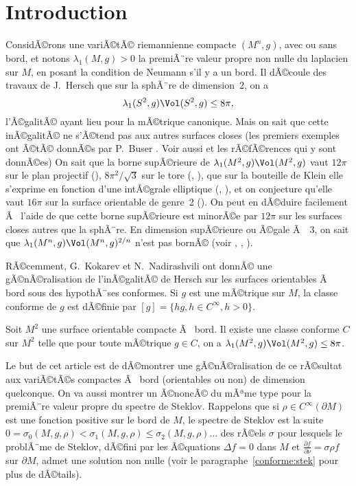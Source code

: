 \documentclass[11pt,a4paper]{smfart}
\begin{document}
\section{Introduction}
ConsidÃ©rons une variÃ©tÃ© riemannienne compacte $(M^n,g)$, avec ou sans bord,
et notons $\lambda_1(M,g)>0$ la premiÃ¨re valeur propre non nulle
du laplacien sur $M$, en posant la condition de Neumann s'il y a un bord.
Il dÃ©coule des travaux de J.~Hersch \cite{he70} que sur la sphÃ¨re de
dimension~2, on a
\begin{equation}
\lambda_1(S^2,g)\Vol(S^2,g)\leq8\pi,
\end{equation}
l'Ã©galitÃ© ayant lieu pour la mÃ©trique canonique.
Mais on sait que cette inÃ©galitÃ© ne s'Ã©tend pas aux autres surfaces closes
(les premiers exemples ont Ã©tÃ© donnÃ©s par P.~Buser \cite{bu84}. Voir
aussi \cite{bm01} et les rÃ©fÃ©rences qui y sont donnÃ©es)
On sait que la borne supÃ©rieure de $\lambda_1(M^2,g)\Vol(M^2,g)$ vaut
$12\pi$ sur le plan projectif (\cite{ly82}), $8\pi^2/\sqrt3$ sur le tore
(\cite{na96}, \cite{gi09}), que sur la bouteille de Klein elle s'exprime
en fonction d'une intÃ©grale elliptique (\cite{jnp06}, \cite{esgj06}),
et on conjecture qu'elle vaut $16\pi$ sur la surface orientable de genre~2 
(\cite{jlnnp05}).
On peut en dÃ©duire facilement
Ã  l'aide de \cite{ces03} que cette borne supÃ©rieure est minorÃ©e par $12\pi$
sur les surfaces closes autres que la sphÃ¨re.
En dimension supÃ©rieure ou Ã©gale Ã ~3,
on sait que $\lambda_1(M^n,g)\Vol(M^n,g)^{2/n}$ n'est pas bornÃ©
(voir \cite{ta79}, \cite{mu80}, \cite{cd94}).

 RÃ©cemment, G.~Kokarev et N.~Nadirashvili ont donnÃ© une gÃ©nÃ©ralisation
de l'inÃ©galitÃ© de Hersch sur les surfaces orientables Ã  bord sous des
hypothÃ¨ses conformes. Si $g$ est une mÃ©trique sur $M$, la classe
conforme de $g$ est dÃ©finie par $[g]=\{hg, h\in C^\infty, h>0\}$.
\begin{theo}[\cite{kn10}]\label{intro:kn}
Soit $M^2$ une surface orientable compacte Ã  bord. Il existe une
classe conforme $C$ sur $M^2$ telle que pour toute mÃ©trique $g\in C$,
on a $\lambda_1(M^2,g)\Vol(M^2,g)\leq8\pi$.
\end{theo}

 Le but de cet article est de dÃ©montrer une gÃ©nÃ©ralisation de ce rÃ©sultat
aux variÃ©tÃ©s compactes Ã  bord (orientables ou non) de dimension quelconque.
On va aussi montrer un Ã©noncÃ© du mÃªme type pour la premiÃ¨re valeur propre
du spectre de Steklov. Rappelons que si $\rho\in C^\infty(\partial M)$
est une fonction positive sur le bord de $M$, le spectre de Steklov est la
suite $0=\sigma_0(M,g,\rho)<\sigma_1(M,g,\rho)\leq\sigma_2(M,g,\rho)\ldots$
des rÃ©els $\sigma$ pour lesquels le problÃ¨me de Steklov, dÃ©fini par les
Ã©quations
$\Delta f=0$ dans $M$ et $\frac{\partial f}{\partial \nu}=\sigma \rho f$
sur $\partial M$, admet une solution non nulle (voir le
paragraphe~\ref{conforme:stek} pour plus de dÃ©tails).
\end{document}
